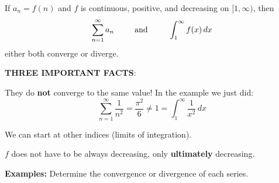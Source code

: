 \documentclass[addpoints, 12pt]{exam}
\begin{document}
\newpage

\begin{tcolorbox}[title= THE INTEGRAL TEST,colframe=black,sharp corners,colback=white,colbacktitle=white,coltitle=black]

    If $a_n=f(n)$ and $f$ is continuous, positive, and decreasing on $[1,\infty)$, then
    \[\sum_{n=1}^{\infty}a_n\hspace{.35in}\text{and}\hspace{.35in} \int_1^{\infty}f(x)\,dx\]
    either both converge or diverge.

\end{tcolorbox}
\vspace{.1in}

\noindent\textbf{THREE IMPORTANT FACTS}:
\begin{questions}
    \question They do \textbf{not} converge to the same value! In the example we just did:
    \[\displaystyle\sum_{n=1}^\infty \frac{1}{n^2}=\frac{\pi^2}{6}\ne1=\int_1^\infty\frac{1}{x^2}\,dx\]
    
    \question We can start at other indices (limits of integration).
    
    \question $f$ does not have to be always decreasing, only \textbf{ultimately} decreasing.
\end{questions}
\vspace{.1in}

\noindent\textbf{Examples:} Determine the convergence or divergence of each series.
\end{document}
